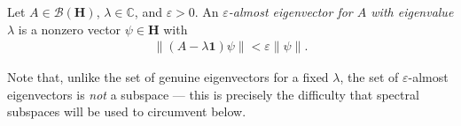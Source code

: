 \begin{definition}
    \label{def:hall-10.24}
    \leanok
    Let $A \in \mathcal{B}(\mathbf{H})$, $\lambda \in \mathbb{C}$, and $\varepsilon > 0$. An \textit{$\varepsilon$-almost eigenvector for $A$ with eigenvalue $\lambda$} is a nonzero vector $\psi \in \mathbf{H}$ with
    \begin{align}
        \left\| (A - \lambda\mathbf{1})\psi \right\| < \varepsilon \left\| \psi \right\|.
    \end{align}
\end{definition}

Note that, unlike the set of genuine eigenvectors for a fixed $\lambda$, the set of $\varepsilon$-almost eigenvectors is \textit{not} a subspace — this is precisely the difficulty that spectral subspaces will be used to circumvent below.

